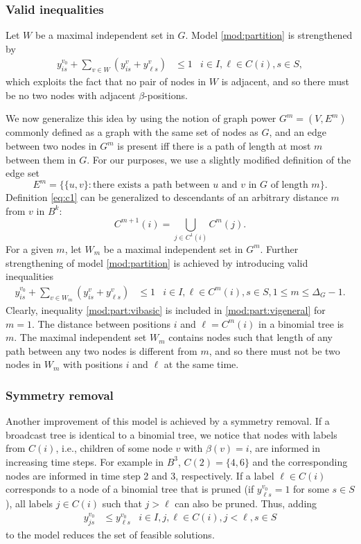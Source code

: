 \subsubsection{Valid inequalities}
Let $W$ be a maximal independent set in $G$.
Model \eqref{mod:partition} is strengthened by 
\begin{align}
\label{mod:part:vibasic}
y^{v_0}_{is}+ \sum\limits_{v\in W}(y^v_{is}+y^v_{\ell s})&\leq 1 & i\in I,\ell\in C(i), s\in S, 
\end{align}
which exploits the fact that no pair of nodes in $W$ is adjacent, and so there must be no two nodes with adjacent $\beta$-positions.

We now generalize this idea by using the notion of graph power $G^m=(V,E^m)$ commonly defined as a graph with the same set of nodes as $G$,
and an edge between two nodes in $G^m$ is present iff there is a path of length at most $m$ between them in $G$.
For our purposes, we use a slightly modified definition of the edge set
$$E^m=\{\{u,v\}:\text{there exists a path between $u$ and $v$ in $G$ of length $m$}\}.$$
Definition \eqref{eq:c1} can be generalized to descendants of an arbitrary distance $m$ from $v$ in $B^k$:
\begin{equation}
C^{m+1}(i)=\bigcup_{j\in C^1(i)}C^m(j).
\end{equation}
For a given $m$, let $W_m$ be a maximal independent set in $G^m$.
Further strengthening of model \eqref{mod:partition} is achieved by introducing valid inequalities
\begin{align}
\label{mod:part:vigeneral}
y^{v_0}_{is}+ \sum\limits_{v\in W_m}(y^v_{is}+y^v_{\ell s})&\leq 1 & i\in I,\ell\in C^m(i), s\in S,1\leq m\leq \Delta_G-1. 
\end{align}
Clearly, inequality \eqref{mod:part:vibasic} is included in \eqref{mod:part:vigeneral} for $m=1$.
The distance between positions $i$ and $\ell=C^m(i)$ in a binomial tree is $m$.
The maximal independent set $W_m$ contains nodes such that length of any path between any two nodes is different from $m$, 
and so there must not be two nodes in $W_m$ with positions $i$ and $\ell$ at the same time.

\subsubsection{Symmetry removal}
Another improvement of this model is achieved by a symmetry removal.
If a broadcast tree is identical to a binomial tree, we notice that nodes with labels from $C(i)$, i.e., children of some node $v$ with $\beta(v)=i$, are informed in increasing time steps.
For example in $B^3$, $C(2)=\{4,6\}$ and the corresponding nodes are informed in time step 2 and 3, respectively.
If a label $\ell\in C(i)$ corresponds to a node of a binomial tree that is pruned (if $y^{v_0}_{\ell s}=1$ for some $s\in S$), 
all labels $j\in C(i)$ such that $j>\ell$ can also be pruned. 
Thus, adding 
\begin{align}
\label{mod:part:sr}
y^{v_0}_{js}&\leq y^{v_0}_{\ell s}&i\in I,j,\ell\in C(i),j<\ell, s\in S
\end{align}
to the model reduces the set of feasible solutions.

